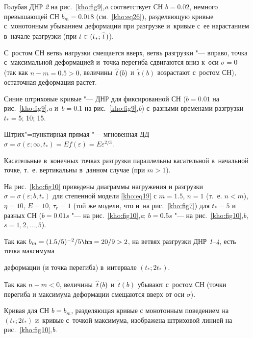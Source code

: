 Голубая ДНР {\sl 2} на рис.~\ref{kho:fig9},{\sl a} соответствует СН $b=0.02$, немного превышающей СН $b_m=0.018$ (см.~\eqref{kho:eq26}), разделяющую кривые с~монотонным убыванием деформации при разгрузке и~кривые с~ее нарастанием в~начале разгрузки (при $t\in(t_\ast;\mathord{\buildrel{\lower3pt\hbox{$\scriptscriptstyle\frown$}}\over {t}})$). 

С~ростом СН ветвь нагрузки смещается вверх, ветвь разгрузки "--- вправо, точка с~максимальной деформацией и~точка перегиба сдвигаются вниз к~оси $\sigma=0$ (так как $n-m=0.5>0$, величины $\mathord{\buildrel{\lower3pt\hbox{$\scriptscriptstyle\frown$}}\over {t}}(b)$ и~$\tilde {t} (b)$ возрастают с~ростом СН), остаточная деформация растет. 

Синие штриховые кривые "--- ДНР для фиксированной СН ($b=0.01$ на рис.~\ref{kho:fig9},{\sl a} и~$b=0.1$ на рис.~\ref{kho:fig9},{\sl b}) с~разными временами разгрузки $t_*=5$; 10; 15. 

Штрих"=пунктирная прямая "--- мгновенная ДД $\sigma=\sigma(\varepsilon;\infty,t_\ast )=Ef(\varepsilon)=E\varepsilon^{2/3}$. 

Касательные в~конечных точках разгрузки параллельны касательной в~начальной точке, т.~е. вертикальны в~данном случае (при $m>1$).



На рис.~\ref{kho:fig10} приведены диаграммы нагружения и разгрузки $\sigma=\sigma(\varepsilon;b,t_\ast)$ для степенной модели \eqref{kho:eq19} с $m=1.5$, $n=1$ (т.~е. $n<m$), $\eta=10$, ${E=10}$, $\tau_r=1$ (той же модели, что и~на рис.~\ref{kho:fig7}) для $t_\ast=5$ и разных СН ($b=0.01s$  "--- на рис.~\ref{kho:fig10},{\sl a}; $b=0.5s$ "--- на рис.~\ref{kho:fig10},{\sl b}, $s=1,2, \dots,5$). 

Так как $b_m=(1.5/5)^{-2}/5\hm =20/9>2$, на ветвях разгрузки ДНР {\sl 1}--{\sl 4}, есть точка максимума

деформации (и точка перегиба) в~интервале $(t_\ast;2t_\ast)$. 

Так как $n-m<0$, величины $\mathord{\buildrel{\lower3pt\hbox{$\scriptscriptstyle\frown$}}\over{t}}(b)$ и~$\tilde{t}(b)$ убывают с~ростом СН (точки перегиба и максимума деформации смещаются вверх от оси $\sigma$). 

Кривая для СН $b=b_m$, разделяющая кривые с монотонным поведением на $(t_\ast;2t_\ast)$ и~кривые с~точкой максимума, изображена штриховой линией на рис.~\ref{kho:fig10},{\sl b}. 







